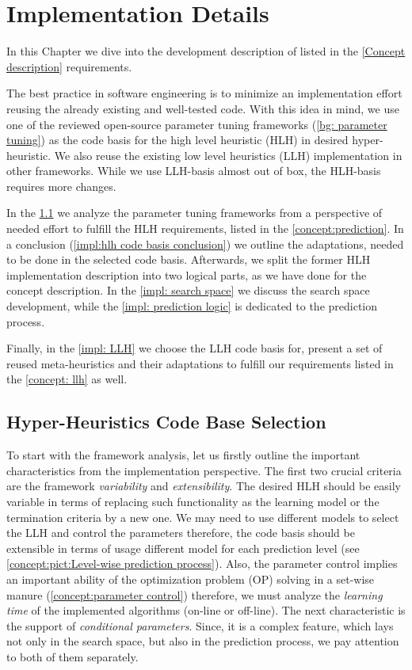 \chapter{Implementation Details}
In this Chapter we dive into the development description of listed in the \cref{Concept description} requirements.
 
The best practice in software engineering is to minimize an implementation effort reusing the already existing and well-tested code. With this idea in mind, we use one of the reviewed open-source parameter tuning frameworks (\cref{bg: parameter tuning}) as the code basis for the high level heuristic (HLH) in desired hyper-heuristic. We also reuse the existing low level heuristics (LLH) implementation in other frameworks. While we use LLH-basis almost out of box, the HLH-basis requires more changes.

In the \cref{impl:hlh code basis section} we analyze the parameter tuning frameworks from a perspective of needed effort to fulfill the HLH requirements, listed in the \cref{concept:prediction}. In a conclusion (\cref{impl:hlh code basis conclusion}) we outline the adaptations, needed to be done in the selected code basis. Afterwards, we split the former HLH implementation description into two logical parts, as we have done for the concept description. In the \cref{impl: search space} we discuss the search space development, while the \ref{impl: prediction logic} is dedicated to the prediction process.

Finally, in the \cref{impl: LLH} we choose the LLH code basis for, present a set of reused meta-heuristics and their adaptations to fulfill our requirements listed in the \cref{concept: llh} as well.


\section{Hyper-Heuristics Code Base Selection}\label{impl:hlh code basis section}
To start with the framework analysis, let us firstly outline the important characteristics from the implementation perspective.
The first two crucial criteria are the framework \emph{variability} and \emph{extensibility}. The desired HLH should be easily variable in terms of replacing such functionality as the learning model or the termination criteria by a new one. We may need to use different models to select the LLH and control the parameters therefore, the code basis should be extensible in terms of usage different model for each prediction level (see \cref{concept:pict:Level-wise prediction process}).
Also, the parameter control implies an important ability of the optimization problem (OP) solving in a set-wise manure (\cref{concept:parameter control}) therefore, we must analyze the \emph{learning time} of the implemented algorithms (on-line or off-line).
The next characteristic is the support of \emph{conditional parameters}. Since, it is a complex feature, which lays not only in the search space, but also in the prediction process, we pay attention to both of them separately.

